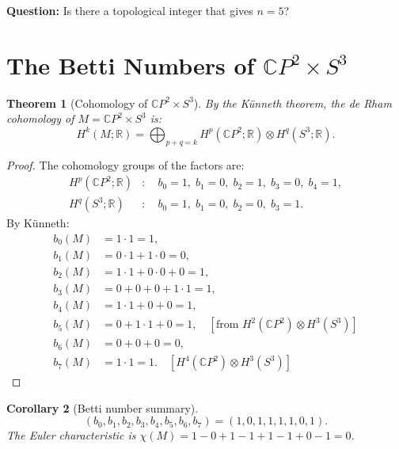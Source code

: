 \documentclass[11pt]{article}
\newtheorem{theorem}{Theorem}[section]
\newtheorem{corollary}[theorem]{Corollary}
\theoremstyle{definition}
\theoremstyle{remark}
\newcommand{\CP}{\mathbb{C}P}
\begin{document}
\textbf{Question:} Is there a topological integer that gives $n = 5$?


\section{The Betti Numbers of $\CP^2 \times S^3$}
\label{sec:betti}

\begin{theorem}[Cohomology of $\CP^2 \times S^3$]
\label{thm:cohomology}
By the K\"unneth theorem, the de Rham cohomology of $M = \CP^2 \times S^3$ is:
\begin{equation}
H^k(M; \mathbb{R}) = \bigoplus_{p+q=k} H^p(\CP^2;\mathbb{R}) \otimes H^q(S^3;\mathbb{R}).
\end{equation}
\end{theorem}

\begin{proof}
The cohomology groups of the factors are:
\begin{align}
H^p(\CP^2;\mathbb{R}) &: \quad b_0 = 1,\; b_1 = 0,\; b_2 = 1,\; b_3 = 0,\; b_4 = 1, \\
H^q(S^3;\mathbb{R}) &: \quad b_0 = 1,\; b_1 = 0,\; b_2 = 0,\; b_3 = 1.
\end{align}
By K\"unneth:
\begin{align}
b_0(M) &= 1 \cdot 1 = 1, \\
b_1(M) &= 0 \cdot 1 + 1 \cdot 0 = 0, \\
b_2(M) &= 1 \cdot 1 + 0 \cdot 0 + 0 = 1, \\
b_3(M) &= 0 + 0 + 0 + 1 \cdot 1 = 1, \\
b_4(M) &= 1 \cdot 1 + 0 + 0 = 1, \\
b_5(M) &= 0 + 1 \cdot 1 + 0 = 1, \quad[\text{from } H^2(\CP^2) \otimes H^3(S^3)]\\
b_6(M) &= 0 + 0 + 0 = 0, \\
b_7(M) &= 1 \cdot 1 = 1.\quad [H^4(\CP^2) \otimes H^3(S^3)]
\end{align}
\end{proof}

\begin{corollary}[Betti number summary]
\label{cor:betti}
\begin{equation}
(b_0, b_1, b_2, b_3, b_4, b_5, b_6, b_7) = (1, 0, 1, 1, 1, 1, 0, 1).
\end{equation}
The Euler characteristic is $\chi(M) = 1 - 0 + 1 - 1 + 1 - 1 + 0 - 1 = 0$.
\end{corollary}
\end{document}
